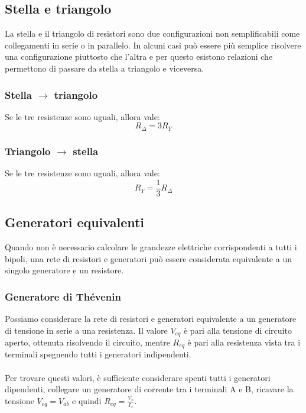 \documentclass{article}
\begin{document}
\subsection{Stella e triangolo}
La stella e il triangolo di resistori sono due configurazioni non semplificabili come collegamenti in serie o in parallelo. In alcuni casi può essere più semplice risolvere una configurazione piuttosto che l'altra e per questo esistono relazioni che permettono di passare da stella a triangolo e viceversa.

\subsubsection{Stella $\rightarrow$ triangolo}
Se le tre resistenze sono uguali, allora vale:
$$ R_\Delta=3R_Y $$

\subsubsection{Triangolo $\rightarrow$ stella}
Se le tre resistenze sono uguali, allora vale:
$$ R_Y=\frac{1}{3}R_\Delta $$

\subsection{Generatori equivalenti}
Quando non è necessario calcolare le grandezze elettriche corrispondenti a tutti i bipoli, una rete di resistori e generatori può essere considerata equivalente a un singolo generatore e un resistore.

\subsubsection{Generatore di Thévenin}
Possiamo considerare la rete di resistori e generatori equivalente a un generatore di tensione in serie a una resistenza.
Il valore $V_{eq}$ è pari alla tensione di circuito aperto, ottenuta risolvendo il circuito, mentre $R_{eq}$ è pari alla resistenza vista tra i terminali spegnendo tutti i generatori indipendenti.\\\\
Per trovare questi valori, è sufficiente considerare spenti tutti i generatori dipendenti, collegare un generatore di corrente tra i terminali A e B, ricavare la tensione $V_{eq}=V_{ab}$ e quindi $R_{eq}=\frac{V_x}{I_x}$.
\end{document}

